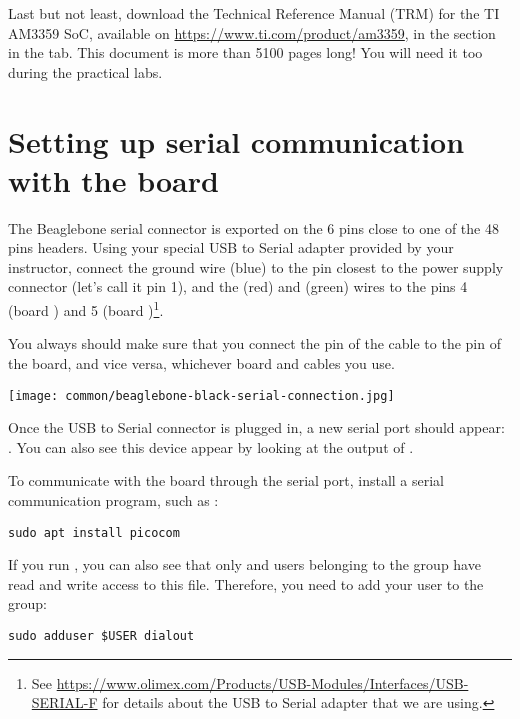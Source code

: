 Last but not least, download the Technical Reference Manual (TRM) for
the TI AM3359 SoC, available on \url{https://www.ti.com/product/am3359},
in the  section in the  tab.
This document is more than 5100 pages long! You will need it
too during the practical labs.

\section{Setting up serial communication with the board}

The Beaglebone serial connector is exported on the 6 pins close to one
of the 48 pins headers. Using your special USB to Serial adapter provided
by your instructor, connect the ground wire (blue) to the pin closest
to the power supply connector (let's call it pin 1), and the  (red)
and  (green) wires to the pins 4 (board ) and
5 (board )\footnote{See
\url{https://www.olimex.com/Products/USB-Modules/Interfaces/USB-SERIAL-F}
for details about the USB to Serial adapter that we are using.}.

You always should make sure that you connect the  pin of the cable
to the  pin of the board, and vice versa, whichever board and
cables you use.

\begin{center}
\texttt{[image: common/beaglebone-black-serial-connection.jpg]}
\end{center}

Once the USB to Serial connector is plugged in, a new serial port
should appear: .  You can also see this device
appear by looking at the output of .

To communicate with the board through the serial port, install a
serial communication program, such as :

\begin{verbatim}
sudo apt install picocom
\end{verbatim}

If you run , you can also see that only
 and users belonging to the  group have
read and write access to this file. Therefore, you need to add your user
to the  group:

\begin{verbatim}
sudo adduser $USER dialout
\end{verbatim}

